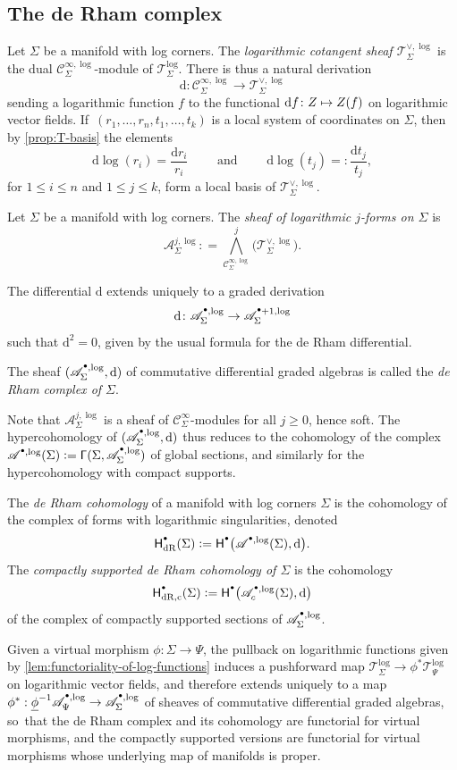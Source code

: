 \documentclass[10pt]{amsart}
\let\oldbullet\bullet
\renewcommand{\bullet}{{\raisebox{1pt}{$\scriptscriptstyle\oldbullet$}}}
\newcommand\mto{\mathchoice{\longmapsto}{\mapsto}{\mapsto}{\mapsto}}
\newcommand{\rbirac}[1]{\bigl(#1\bigr)}
\newcommand{\bcoH}[2][\bullet]{\mathsf{H}^{#1}\rbirac{#2}}
\theoremstyle{definition}
\theoremstyle{remark}
\let\defn\emph
\renewcommand{\le}{\leqslant}
\renewcommand{\ge}{\geqslant}
\newcommand{\defas}{\mathrel{\mathop:}=}
\newcommand{\Cinf}[1]{\mathscr{C}^{\infty}_{#1}}
\newcommand{\Cinflog}[1]{\mathscr{C}^{\infty,\log}_{#1}}
\newcommand{\dd}{\mathrm{d}}
\newcommand{\dlog}[1]{\frac{\dd#1}{#1}}
\newcommand{\cAlog}[2][\bullet]{\mathscr{A}^{#1,\log}_{#2}}
\newcommand{\Alogc}[2][\bullet]{\mathscr{A}^{#1,\log}_c(#2)}
\newcommand{\VFlog}[1]{\mathcal{T}^{\log}_{#1}}
\newcommand{\coVFlog}[1]{\mathcal{T}^{\vee,\log}_{#1}}
\newcommand{\Sig}{\Sigma}
\newcommand{\uphi}{\underline{\phi}}
\newcommand{\sect}[1]{\mathsf{\Gamma}(#1)}
\newcommand{\HdR}[2][\bullet]{\mathsf{H}_{\mathrm{dR}}^{#1}(#2)}
\newcommand{\HdRc}[2][\bullet]{\mathsf{H}_{\mathrm{dR},\mathrm{c}}^{#1}(#2)}
\begin{document}
\subsection{The de Rham complex}
Let $\Sig$ be a manifold with log corners. The \defn{logarithmic cotangent sheaf $\coVFlog{\Sig}$} is the dual $\Cinflog{\Sig}$-module of $\VFlog{\Sig}$. There is thus a natural derivation
\[
\dd\colon \Cinflog{\Sig} \to \coVFlog{\Sig}
\]
sending a logarithmic function $f$ to the functional $\dd f \colon Z \mto Z(f)$ on logarithmic vector fields. If~$(r_1,\ldots,r_n,t_1,\ldots,t_k)$ is a local system of coordinates on $\Sig$, then by \autoref{prop:T-basis} the elements
\[
\dd \log(r_i) = \dlog{r_i} \qquad \mbox{ and } \qquad \dd\log(t_j) =: \dlog{t_j},
\]
for $1 \le i \le n$ and $1 \le j \le k$, form a local basis of $\coVFlog{\Sig}$.

\begin{definition}
Let $\Sig$ be a manifold with log corners. The \defn{sheaf of logarithmic $j$-forms on $\Sig$} is
\[
\cAlog[j]{\Sig} \defas {\bigwedge}^j_{\Cinflog{\Sig}}\bigl(\coVFlog{\Sig}\bigr).
\]
\end{definition}
The differential $\dd$ extends uniquely to a graded derivation
\[
\dd\colon \cAlog{\Sig} \to \cAlog[\bullet+1]{\Sig}
\]
such that $\dd^2=0$, given by the usual formula for the de Rham differential.

\begin{lemma}
The sheaf $(\cAlog{\Sig},\dd)$ of commutative differential graded algebras is called the \defn{de Rham complex of $\Sig$}.
\end{lemma}

Note that $\cAlog[j]{\Sig}$ is a sheaf of $\Cinf{\Sig}$-modules for all $j\ge0 $, hence soft. The hypercohomology of $(\cAlog{\Sig},\dd)$ thus reduces to the cohomology of the complex $\cAlog{}(\Sig) \defas \sect{\Sig,\cAlog{\Sig}}$ of global sections, and similarly for the hypercohomology with compact supports.

\begin{definition}
The \defn{de Rham cohomology} of a manifold with log corners $\Sig$ is the cohomology of the complex of forms with logarithmic singularities, denoted
\[
\HdR{\Sig} \defas \bcoH{\cAlog{}(\Sig),\dd}.
\]
The \defn{compactly supported de Rham cohomology of $\Sig$} is the cohomology
\[
\HdRc{\Sig}\defas \bcoH{\Alogc{\Sig},\dd}
\]
of the complex of compactly supported sections of $\cAlog{\Sig}$.
\end{definition}

Given a virtual morphism $\phi \colon \Sig \to \Psi$, the pullback on logarithmic functions given by \autoref{lem:functoriality-of-log-functions} induces a pushforward map $\VFlog{\Sig} \to \phi^*\VFlog{\Psi}$ on logarithmic vector fields, and therefore extends uniquely to a map $\phi^* : \uphi^{-1}\cAlog{\Psi} \to \cAlog{\Sig}$ of sheaves of commutative differential graded algebras, so~that the de Rham complex and its cohomology are functorial for virtual morphisms, and the compactly supported versions are functorial for virtual morphisms whose underlying map of manifolds is proper.
\end{document}
